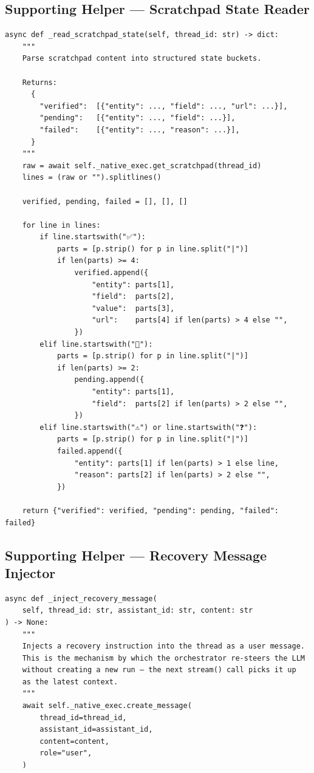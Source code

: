 \subsection*{Supporting Helper — Scratchpad State Reader}

\begin{verbatim}
async def _read_scratchpad_state(self, thread_id: str) -> dict:
    """
    Parse scratchpad content into structured state buckets.

    Returns:
      {
        "verified":  [{"entity": ..., "field": ..., "url": ...}],
        "pending":   [{"entity": ..., "field": ...}],
        "failed":    [{"entity": ..., "reason": ...}],
      }
    """
    raw = await self._native_exec.get_scratchpad(thread_id)
    lines = (raw or "").splitlines()

    verified, pending, failed = [], [], []

    for line in lines:
        if line.startswith("✅"):
            parts = [p.strip() for p in line.split("|")]
            if len(parts) >= 4:
                verified.append({
                    "entity": parts[1],
                    "field":  parts[2],
                    "value":  parts[3],
                    "url":    parts[4] if len(parts) > 4 else "",
                })
        elif line.startswith("🔄"):
            parts = [p.strip() for p in line.split("|")]
            if len(parts) >= 2:
                pending.append({
                    "entity": parts[1],
                    "field":  parts[2] if len(parts) > 2 else "",
                })
        elif line.startswith("⚠️") or line.startswith("❓"):
            parts = [p.strip() for p in line.split("|")]
            failed.append({
                "entity": parts[1] if len(parts) > 1 else line,
                "reason": parts[2] if len(parts) > 2 else "",
            })

    return {"verified": verified, "pending": pending, "failed": failed}
\end{verbatim}

\subsection*{Supporting Helper — Recovery Message Injector}

\begin{verbatim}
async def _inject_recovery_message(
    self, thread_id: str, assistant_id: str, content: str
) -> None:
    """
    Injects a recovery instruction into the thread as a user message.
    This is the mechanism by which the orchestrator re-steers the LLM
    without creating a new run — the next stream() call picks it up
    as the latest context.
    """
    await self._native_exec.create_message(
        thread_id=thread_id,
        assistant_id=assistant_id,
        content=content,
        role="user",
    )
\end{verbatim}

